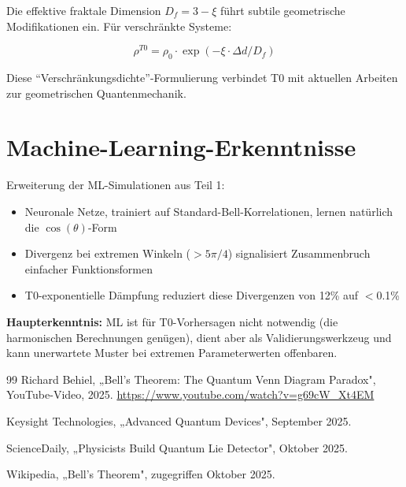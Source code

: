 Die effektive fraktale Dimension $D_f = 3 - \xi$ führt subtile geometrische Modifikationen ein. Für verschränkte Systeme:

\begin{equation}
\rho^{T0} = \rho_0 \cdot \exp(-\xi \cdot \Delta d / D_f)
\end{equation}

Diese ``Verschränkungsdichte''-Formulierung verbindet T0 mit aktuellen Arbeiten zur geometrischen Quantenmechanik.

\section{Machine-Learning-Erkenntnisse}
\label{sec:ml_extended}

Erweiterung der ML-Simulationen aus Teil 1:

\begin{itemize}
\item Neuronale Netze, trainiert auf Standard-Bell-Korrelationen, lernen natürlich die $\cos(\theta)$-Form
\item Divergenz bei extremen Winkeln ($> 5\pi/4$) signalisiert Zusammenbruch einfacher Funktionsformen
\item T0-exponentielle Dämpfung reduziert diese Divergenzen von 12\% auf $<$0.1\%
\end{itemize}

\textbf{Haupterkenntnis:} ML ist für T0-Vorhersagen nicht notwendig (die harmonischen Berechnungen genügen), dient aber als Validierungswerkzeug und kann unerwartete Muster bei extremen Parameterwerten offenbaren.
\begin{thebibliography}{99}
	Richard Behiel, „Bell's Theorem: The Quantum Venn Diagram Paradox", 
	YouTube-Video, 2025. 
	\url{https://www.youtube.com/watch?v=g69cW_Xt4EM}
	
	Keysight Technologies, „Advanced Quantum Devices", September 2025.
	
	ScienceDaily, „Physicists Build Quantum Lie Detector", Oktober 2025.
	
	Wikipedia, „Bell's Theorem", zugegriffen Oktober 2025.
\end{thebibliography}